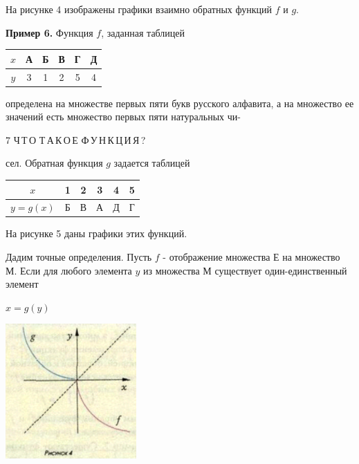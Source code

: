 \begin{minipage}{0.45\textwidth}
  \parindent=0.5cm На рисунке 4 изображены графики взаимно обратных функций $f$ и $g$. 
  
 \parindent=0.5cm  {\bf Пример 6.} Функция $f$, заданная таблицей
  \begin{center}
  \begin{tabular} {|c|c|c|c|c|c|}
  \hline
  $x$ & А & Б & В & Г & Д \\ \hline
  $y$ & 3 & 1 & 2 & 5 & 4 \\ \hline
  \end{tabular}
  \end{center}
  определена на множестве первых пяти букв русского алфавита, а на множество ее значений есть множество первых пяти натуральных чи-
\end{minipage}

\thispagestyle{empty}
\newpage
\begin{center}
    \huge{7}
    \noindent\makebox[\linewidth]{\rule{\paperwidth}{0.4pt}}
    \small {Ч\,Т\,О Т\,А\,К\,О\,Е Ф\,У\,Н\,К\,Ц\,И\,Я\,?}
\end{center}
\vspace{1cm}
\begin{minipage}{0.45\textwidth}
сел. Обратная функция $g$ задается таблицей
\begin{center}
\begin{tabular}{|c|c|c|c|c|c|}
\hline
$x$ & 1 & 2 & 3 & 4 & 5 \\ \hline
$y = g(x)$ & Б & В & А & Д & Г\\\hline
\end{tabular}
\end{center}

\parindent=0.5cm На рисунке 5 даны графики этих функций.

\parindent=0.5cm Дадим точные определения. Пусть $f$ - отображение множества Е на множество М. Если для любого элемента $y$ из множества М существует один-единственный элемент
\begin{center}
$x = g(y)$
\end{center}
\end{minipage}
\hfill
\begin{minipage}{0.45\textwidth}

\begin{center}
\includegraphics[width=5cm]{pic.png}\\
\end{center}

\end{minipage}
\thispagestyle{empty}
 
